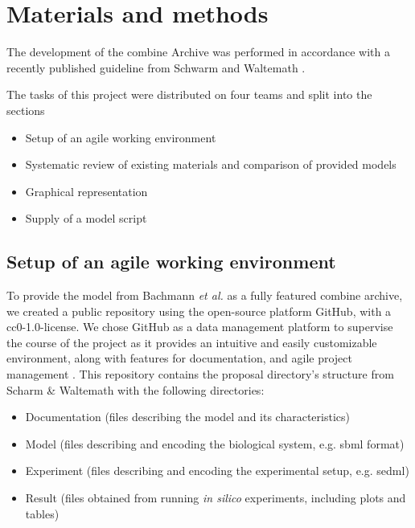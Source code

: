 \section*{Materials and methods} \label{sec:matmet}

The development of the \ac{combine} Archive was performed in accordance with a recently published guideline from Schwarm and Waltemath \cite{combine}.

The tasks of this project were distributed on  four teams and split into the sections 
\begin{itemize}
    \item Setup of an agile working environment
    \item Systematic review of existing materials and comparison of provided models
    \item Graphical representation
    \item Supply of a model script
\end{itemize}

\subsection*{Setup of an agile working environment} \label{setupagwork}
To provide the model from Bachmann \textit{et al.} \cite{bachmannmodel} as a fully featured \ac{combine} archive, we created a public repository using the open-source platform GitHub, with a \ac{cc}0-1.0-license. We chose GitHub as a data management platform to supervise the course of the project as it provides an intuitive and easily customizable environment, along with features for documentation, and agile project management \cite{github}. This repository contains the proposal directory's structure from Scharm \& Waltemath \cite{combine} with the following directories:
\begin{itemize}
    \item Documentation (files describing the model and its characteristics)
    \item Model (files describing and encoding the biological system, e.g. \ac{sbml} format)
    \item Experiment (files describing and encoding the experimental setup, e.g. \ac{sedml})
    \item Result (files obtained from running \textit{in silico} experiments, including plots and tables)
\end{itemize}


